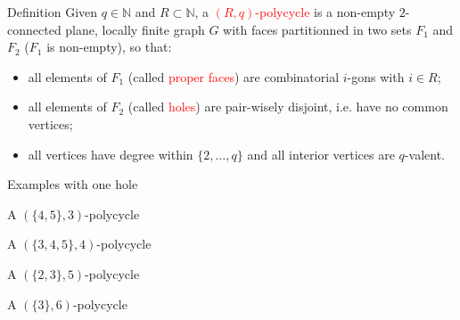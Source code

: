 \documentclass[%
pdf,
colorBG,
slideColor,
]{prosper}
\newcommand{\NN}{\ensuremath{\mathbb{N}}}
\begin{document}
\begin{slide}{Definition}
Given $q\in \NN$ and $R\subset \NN$, a \textcolor{red}{$(R,q)$-polycycle} is a non-empty $2$-connected plane, locally finite graph $G$
with faces partitionned in two sets $F_1$ and $F_2$ ($F_1$ is non-empty), so that:
\begin{itemize}
\item all elements of $F_1$ (called \textcolor{red}{proper faces}) are
combinatorial $i$-gons with $i\in R$;

\item all elements of $F_2$ (called \textcolor{red}{holes}) are pair-wisely disjoint, i.e. have no common vertices;

\item all vertices have degree within $\{2,\dots,q\}$ and all interior
vertices are $q$-valent.
\end{itemize}

\end{slide}




\begin{slide}{Examples with one hole}
\begin{center}
\begin{minipage}[b]{5.0cm}
\centering
{}\par
A $(\{4,5\}, 3)$-polycycle
\end{minipage}
\begin{minipage}[b]{5.0cm}
\centering
{}\par
A $(\{3,4,5\}, 4)$-polycycle
\end{minipage}
\begin{minipage}[b]{5.0cm}
\centering
{}\par
A $(\{2,3\}, 5)$-polycycle
\end{minipage}
\begin{minipage}[b]{5.0cm}
\centering
{}\par
A $(\{3\}, 6)$-polycycle
\end{minipage}


\end{center}
\end{slide}
\end{document}
